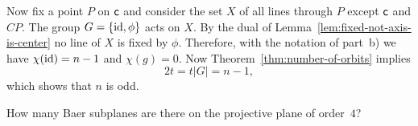 \begin{solution}
\begin{enumerate}[a)]
        Now fix a point $P$ on $\mathsf c$ and consider the set $X$ of all lines through $P$ except $\mathsf c$ and $CP$. The group $G=\{\operatorname{id},\phi\}$ acts on $X$. By the dual of Lemma~\ref{lem:fixed-not-axis-is-center} no line of $X$ is fixed by $\phi$. Therefore, with the notation of part~b) we have $\chi(\operatorname{id})=n-1$ and $\chi(g)=0$. Now Theorem~\ref{thm:number-of-orbits} implies
        \[
            2t = t|G|=n-1,
        \]
        which shows that $n$ is odd. \qedhere
    \end{enumerate}
\end{solution}

\begin{exr}\label{exr:baer-subplanes-of-order-4-plane}
    How many Baer subplanes are there on the projective plane of order\/~$4$?
\end{exr}

